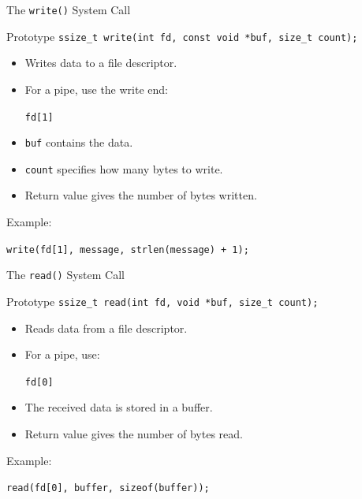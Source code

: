 \documentclass[aspectratio=169]{beamer}
\begin{document}
\begin{frame}{The \texttt{write()} System Call}

\begin{block}{Prototype}
\centering
\texttt{ssize\_t write(int fd, const void *buf, size\_t count);}
\end{block}

\begin{itemize}
    \item Writes data to a file descriptor.
    \item For a pipe, use the write end:
    \begin{center}
    \texttt{fd[1]}
    \end{center}
    \item \texttt{buf} contains the data.
    \item \texttt{count} specifies how many bytes to write.
    \item Return value gives the number of bytes written.
\end{itemize}

Example:

\begin{center}
\texttt{write(fd[1], message, strlen(message) + 1);}
\end{center}

\end{frame}

\begin{frame}{The \texttt{read()} System Call}

\begin{block}{Prototype}
\centering
\texttt{ssize\_t read(int fd, void *buf, size\_t count);}
\end{block}

\begin{itemize}
    \item Reads data from a file descriptor.
    \item For a pipe, use:
    \begin{center}
    \texttt{fd[0]}
    \end{center}
    \item The received data is stored in a buffer.
    \item Return value gives the number of bytes read.
\end{itemize}

Example:

\begin{center}
\texttt{read(fd[0], buffer, sizeof(buffer));}
\end{center}

\end{frame}
\end{document}
